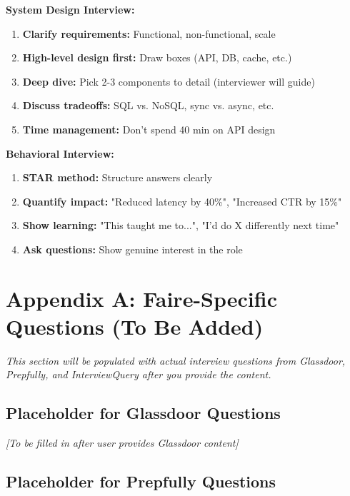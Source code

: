 \documentclass[11pt,letterpaper]{article}
\begin{document}
\textbf{System Design Interview:}
\begin{enumerate}
    \item \textbf{Clarify requirements:} Functional, non-functional, scale
    \item \textbf{High-level design first:} Draw boxes (API, DB, cache, etc.)
    \item \textbf{Deep dive:} Pick 2-3 components to detail (interviewer will guide)
    \item \textbf{Discuss tradeoffs:} SQL vs. NoSQL, sync vs. async, etc.
    \item \textbf{Time management:} Don't spend 40 min on API design
\end{enumerate}

\textbf{Behavioral Interview:}
\begin{enumerate}
    \item \textbf{STAR method:} Structure answers clearly
    \item \textbf{Quantify impact:} "Reduced latency by 40\%", "Increased CTR by 15\%"
    \item \textbf{Show learning:} "This taught me to...", "I'd do X differently next time"
    \item \textbf{Ask questions:} Show genuine interest in the role
\end{enumerate}

\section{Appendix A: Faire-Specific Questions (To Be Added)}

\textit{This section will be populated with actual interview questions from Glassdoor, Prepfully, and InterviewQuery after you provide the content.}

\subsection{Placeholder for Glassdoor Questions}

\textit{[To be filled in after user provides Glassdoor content]}

\subsection{Placeholder for Prepfully Questions}
\end{document}
